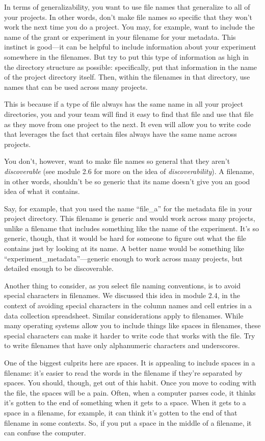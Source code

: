 \documentclass[]{tufte-book}
\begin{document}
In terms of generalizability, you want to use file names that generalize to all
of your projects. In other words, don't make file names so specific that they
won't work the next time you do a project. You may, for example, want to include
the name of the grant or experiment in your filename for your metadata. This
instinct is good---it can be helpful to include information about your
experiment somewhere in the filenames. But try to put this type of information
as high in the directory structure as possible: specifically, put that information in
the name of the project directory itself. Then, within the filenames in that
directory, use names that can be used across many projects.

This is because if a type of file always has the same name in all your project
directories, you and your team will find it easy to find that file and use
that file as they move from one project to the next. It even will allow you
to write code that leverages the fact that certain files always have the
same name across projects.

You don't, however, want to make file names so general that they aren't
\emph{discoverable} (see module 2.6 for more on the idea of \emph{discoverability}).
A filename, in other words, shouldn't be so generic that its name doesn't
give you an good idea of what it contains.

Say, for example, that you used the name ``file\_a'' for the metadata file in your
project directory. This filename is generic and would work across many projects,
unlike a filename that includes something like the name of the experiment. It's
so generic, though, that it would be hard for someone to figure out what the
file contains just by looking at its name. A better name would be something like
``experiment\_metadata''---generic enough to work across many projects, but
detailed enough to be discoverable.

Another thing to consider, as you select file naming conventions, is to avoid
special characters in filenames. We discussed this idea in module 2.4, in
the context of avoiding special characters in the column names and cell entries
in a data collection spreadsheet. Similar considerations apply to filenames.
While many operating systems allow you to include things like spaces in
filenames, these special characters can make it harder to write code that works
with the file. Try to write filenames that have only alphanumeric characters and
underscores.

One of the biggest culprits here are spaces. It is appealing to include spaces
in a filename: it's easier to read the words in the filename if they're
separated by spaces. You should, though, get out of this habit. Once you move to
coding with the file, the spaces will be a pain. Often, when a computer parses
code, it thinks it's gotten to the end of something when it gets to a space.
When it gets to a space in a filename, for example, it can think it's gotten to
the end of that filename in some contexts. So, if you put a space in the middle
of a filename, it can confuse the computer.
\end{document}
